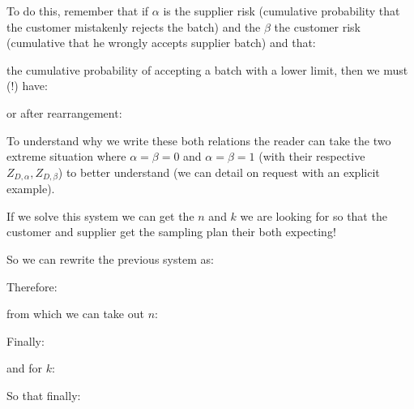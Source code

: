 	To do this, remember that if $\alpha$ is the supplier risk (cumulative probability that the customer mistakenly rejects the batch) and the $\beta$ the customer risk (cumulative that he wrongly accepts supplier batch) and that:
	
	the cumulative probability of accepting a batch with a lower limit, then we must (!) have:
	
	or after rearrangement:
	
	To understand why we write these both relations the reader can take the two extreme situation where $\alpha=\beta=0$ and $\alpha=\beta=1$ (with their respective $Z_{D,\alpha},Z_{D,\beta}$) to better understand (we can detail on request with an explicit example).

	If we solve this system we can get the $n$ and $k$ we are looking for so that the customer and supplier get the sampling plan their both expecting!

	So we can rewrite the previous system as:
	
	Therefore:
	
	from which we can take out $n$:
	
	Finally:
	
	and for $k$:
	
	So that finally:
	
